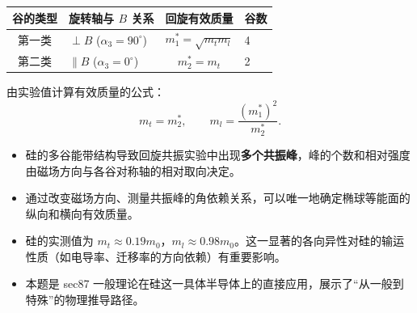 \begin{formulabox}[答案汇总]
\begin{center}
\begin{tabular}{clcl}
\toprule
\textbf{谷的类型} & \textbf{旋转轴与 $B$ 关系} & \textbf{回旋有效质量} & \textbf{谷数} \\
\midrule
第一类 & $\perp B$ ($\alpha_3=90^\circ$) & $m_1^*=\sqrt{m_tm_l}$ & 4 \\
第二类 & $\parallel B$ ($\alpha_3=0^\circ$) & $m_2^*=m_t$ & 2 \\
\bottomrule
\end{tabular}
\end{center}

由实验值计算有效质量的公式：
\begin{equation}
m_t=m_2^*,\qquad m_l=\frac{(m_1^*)^2}{m_2^*}.
\end{equation}
\end{formulabox}

\begin{insightbox}[物理图像]
\begin{itemize}
    \item 硅的多谷能带结构导致回旋共振实验中出现\textbf{多个共振峰}，峰的个数和相对强度由磁场方向与各谷对称轴的相对取向决定。
    \item 通过改变磁场方向、测量共振峰的角依赖关系，可以唯一地确定椭球等能面的纵向和横向有效质量。
    \item 硅的实测值为 $m_t\approx0.19m_0$，$m_l\approx0.98m_0$。这一显著的各向异性对硅的输运性质（如电导率、迁移率的方向依赖）有重要影响。
    \item 本题是 sec87 一般理论在硅这一具体半导体上的直接应用，展示了``从一般到特殊''的物理推导路径。
\end{itemize}
\end{insightbox}
